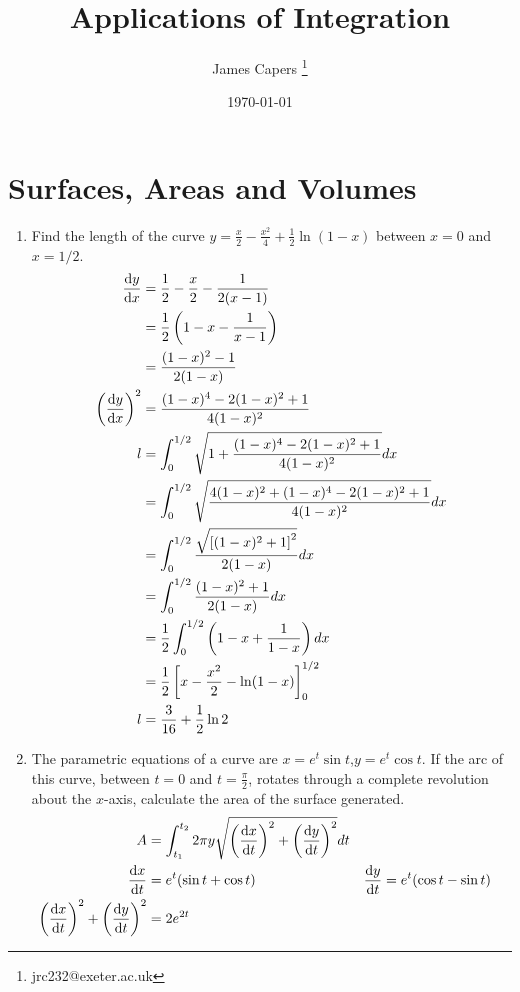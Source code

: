 \documentclass{article}
\title{Applications of Integration}
\author{James Capers \thanks{jrc232@exeter.ac.uk}}
\date{\today}
\begin{document}
\maketitle


\section{Surfaces, Areas and Volumes}

\begin{enumerate}
	\item{Find the length of the curve $y= \frac{x}{2} - \frac{x^2}{4} +\frac{1}{2} \ln(1-x)$ between $x=0$ and $x=1/2$.
		\begin{align*}
			\dv{y}{x} &= \frac{1}{2} - \frac{x}{2} - \frac{1}{2(x-1)} \\
			&= \frac{1}{2} \left( 1 - x - \frac{1}{x-1} \right) \\
			&= \frac{(1-x)^2 - 1}{2(1-x)} \\
			\left( \dv{y}{x} \right)^2 &= \frac{(1-x)^4 - 2(1-x)^2 + 1}{4(1-x)^2} \\
			l &= \int_0^{1/2} \sqrt{1 + \frac{(1-x)^4 - 2(1-x)^2 + 1}{4(1-x)^2} } dx\\
			&= \int_0^{1/2} \sqrt{ \frac{4(1-x)^2 + (1-x)^4 - 2(1-x)^2 + 1}{4(1-x)^2} } dx \\
			&= \int_0^{1/2} \frac{\sqrt{\left[ (1-x)^2 + 1 \right]^2}}{2(1-x)} dx\\
			&= \int_0^{1/2} \frac{(1-x)^2 + 1}{2(1-x)} dx \\
			&= \frac{1}{2} \int_0^{1/2} \left( 1-x + \frac{1}{1-x} \right) dx \\
			&= \frac{1}{2} \left[ x - \frac{x^2}{2} - \ln (1-x) \right]_0^{1/2} \\
			l &= \frac{3}{16} + \frac{1}{2} \ln 2
		\end{align*}			
	}
	\item{The parametric equations of a curve are $x = e^t \sin t$,$y = e^t \cos t$. If the arc of this curve, between $t = 0$ and $t = \frac{\pi}{2}$, rotates through a complete revolution about the $x$-axis, calculate the area of the surface generated.
		\begin{align*}
			A &= \int_{t_1}^{t_2} 2 \pi y \sqrt{\left( \dv{x}{t} \right)^2 + \left( \dv{y}{t} \right)^2 } dt \\
			\dv{x}{t} &= e^t (\sin t + \cos t) & \dv{y}{t} &= e^t (\cos t - \sin t) \\
			\left( \dv{x}{t} \right)^2 + \left( \dv{y}{t} \right)^2 &= 2 e^{2t} \\

\end{align*}}
\end{enumerate}
\end{document}
